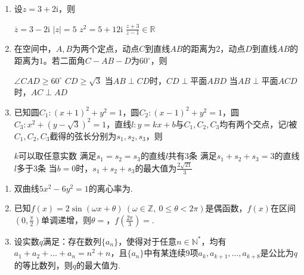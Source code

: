 \documentclass[12pt,a4paper]{article}
\begin{document}
	\begin{enumerate}[leftmargin=*,label=\arabic*.,resume,itemsep=0.8ex]
		\item 设$z=3+2\mathrm{i}$，则
		
		\begin{choicesTwo}
			\choice $\overline{z}=3-2\mathrm{i}$ \choice $|z|=5$ \choice $z^2=5+12\mathrm{i}$ \choice $\frac{z+3}{z-1}\in\mathbb{R}$
		\end{choicesTwo}
		
		\item 在空间中，$A,B$为两个定点，动点$C$到直线$AB$的距离为$2$，动点$D$到直线$AB$的距离为$1$。若二面角$C-AB-D$为$60^\circ$，则
		
		\begin{choicesOne}
			\choice $\angle CAD\ge60^\circ$ \choice $CD\ge\sqrt{3}$ \choice 当$AB\perp CD$时，$CD\perp$平面$ABD$ \choice 当$AB\perp$平面$ACD$时，$AC\perp AD$
		\end{choicesOne}
		
		\item 已知圆$C_1:(x+1)^2+y^2=1$，圆$C_2:(x-1)^2+y^2=1$，圆$C_3:x^2+(y-\sqrt{3})^2=1$，直线$l:y=kx+b$与$C_1,C_2,C_3$均有两个交点，记$l$被$C_1,C_2,C_3$截得的弦长分别为$s_1,s_2,s_3$，则
		
		\begin{choicesOne}
			\choice $k$可以取任意实数 \choice 满足$s_1=s_2=s_3$的直线$l$共有$3$条 \choice 满足$s_1+s_2+s_3=3$的直线$l$多于$3$条 \choice 当$b=0$时，$s_1+s_2+s_3$的最大值为$\frac{2\sqrt{21}}{3}$
		\end{choicesOne}
	\end{enumerate}
	
	\vspace{0.3cm}
	
	
	\begin{enumerate}[leftmargin=*,label=\arabic*.,resume,itemsep=0.8ex]
		\item 双曲线$5x^2-6y^2=1$的离心率为\underline{\qquad\qquad}. 
		
		\item 已知$f(x)=2\sin(\omega x+\theta)\ (\omega\in\mathbb{Z},\ 0\le\theta<2\pi)$是偶函数，$f(x)$在区间$\left(0,\frac{\pi}{2}\right)$单调递增，则$\theta=$\underline{\qquad\qquad}，$f\left(\frac{2\pi}{3}\right)=$\underline{\qquad\qquad}. 
		
		\item 设实数$q$满足：存在数列$\{a_n\}$，使得对于任意$n\in\mathbb{N}^*$，均有$a_1+a_2+\dots+a_n=n^2+n$，且$\{a_n\}$中有某连续$9$项$a_k,a_{k+1},\dots,a_{k+8}$是公比为$q$的等比数列，则$q$的最大值为\underline{\qquad\qquad}. 
	\end{enumerate}
	
\end{document}
